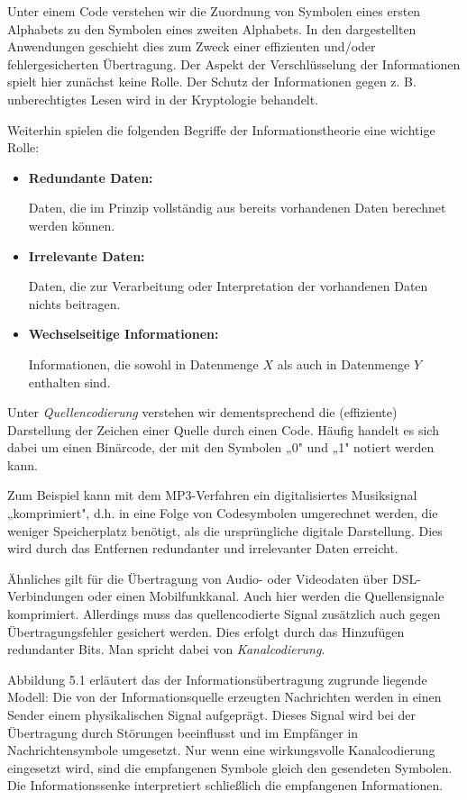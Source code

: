 Unter einem Code verstehen wir die Zuordnung von Symbolen eines ersten Alphabets zu den Symbolen eines zweiten Alphabets. In den dargestellten Anwendungen geschieht dies zum Zweck einer effizienten und/oder fehlergesicherten Übertragung. Der Aspekt der Verschlüsselung der Informationen spielt hier zunächst keine Rolle. Der Schutz der Informationen gegen z. B. unberechtigtes Lesen wird in der Kryptologie behandelt.

Weiterhin spielen die folgenden Begriffe der Informationstheorie eine wichtige Rolle:

\begin{itemize}
  \item \textbf{Redundante Daten:}

    Daten, die im Prinzip vollständig aus bereits vorhandenen Daten berechnet werden können.

  \item \textbf{Irrelevante Daten:}

    Daten, die zur Verarbeitung oder Interpretation der vorhandenen Daten nichts beitragen.

  \item \textbf{Wechselseitige Informationen:}

    Informationen, die sowohl in Datenmenge $X$ als auch in Datenmenge $Y$ enthalten sind.
\end{itemize}

Unter \textit{Quellencodierung} verstehen wir dementsprechend die (effiziente) Darstellung der Zeichen einer Quelle durch einen Code. Häufig handelt es sich dabei um einen Binärcode, der mit den Symbolen „0" und „1" notiert werden kann.

Zum Beispiel kann mit dem MP3-Verfahren ein digitalisiertes Musiksignal „komprimiert", d.h. in eine Folge von Codesymbolen umgerechnet werden, die weniger Speicherplatz benötigt, als die ursprüngliche digitale Darstellung. Dies wird durch das Entfernen redundanter und irrelevanter Daten erreicht.

Ähnliches gilt für die Übertragung von Audio- oder Videodaten über DSL-Verbindungen oder einen Mobilfunkkanal. Auch hier werden die Quellensignale komprimiert. Allerdings muss das quellencodierte Signal zusätzlich auch gegen Übertragungsfehler gesichert werden. Dies erfolgt durch das Hinzufügen redundanter Bits. Man spricht dabei von \textit{Kanalcodierung}.

Abbildung 5.1 erläutert das der Informationsübertragung zugrunde liegende Modell: Die von der Informationsquelle erzeugten Nachrichten werden in einen Sender einem physikalischen Signal aufgeprägt. Dieses Signal wird bei der Übertragung durch Störungen beeinflusst und im Empfänger in Nachrichtensymbole umgesetzt. Nur wenn eine wirkungsvolle Kanalcodierung eingesetzt wird, sind die empfangenen Symbole gleich den gesendeten Symbolen. Die Informationssenke interpretiert schließlich die empfangenen Informationen.

